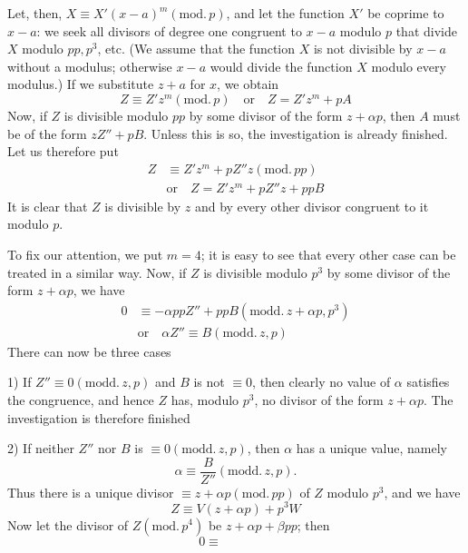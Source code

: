 Let, then, $X\equiv X'(x-a)^m(\mathrm{mod.}\,p)$, and let the function $X'$ be coprime to $x-a$: we seek all divisors of degree one congruent to $x-a$ modulo $p$ that divide $X$ modulo $pp,p^3$, etc. (We assume that the function $X$ is not divisible by $x-a$ without a modulus; otherwise $x-a$ would divide the function $X$ modulo every modulus.) If we substitute $z+a$ for $x$, we obtain
\[
Z\equiv Z'z^m(\mathrm{mod.}\,p)\quad\text{or}\quad Z=Z'z^m+pA
\]
Now, if $Z$ is divisible modulo $pp$ by some divisor of the form $z+\alpha p$, then $A$ must be of the form $zZ''+pB$. Unless this is so, the investigation is already finished. Let us therefore put
\[
\begin{aligned}
Z&\equiv Z'z^m+pZ''z(\mathrm{mod.}\,pp)\\
&\text{or}\quad Z=Z'z^m+pZ''z+ppB
\end{aligned}
\]
It is clear that $Z$ is divisible by $z$ and by every other divisor congruent to it modulo $p$.

To fix our attention, we put $m=4$; it is easy to see that every other case can be treated in a similar way. Now, if $Z$ is divisible modulo $p^3$ by some divisor of the form $z+\alpha p$, we have
\[
\begin{aligned}
0&\equiv-\alpha ppZ''+ppB(\mathrm{modd.}\,z+\alpha p,p^3)\\
&\text{or}\quad\alpha Z''\equiv B(\mathrm{modd.}\,z,p)
\end{aligned}
\]
There can now be three cases

1) If $Z''\equiv0(\mathrm{modd.}\,z,p)$ and $B$ is not $\equiv0$, then clearly no value of $\alpha$ satisfies the congruence, and hence $Z$ has, modulo $p^3$, no divisor of the form $z+\alpha p$. The investigation is therefore finished

2) If neither $Z''$ nor $B$ is $\equiv0(\mathrm{modd.}\,z,p)$, then $\alpha$ has a unique value, namely
\[
\alpha\equiv\frac B{Z''}(\mathrm{modd.}\,z,p).
\]
Thus there is a unique divisor $\equiv z+\alpha p(\mathrm{mod.}\,pp)$ of $Z$ modulo $p^3$, and we have
\[
Z\equiv V(z+\alpha p)+p^3W
\]
Now let the divisor of $Z(\mathrm{mod.}\,p^4)$ be $z+\alpha p+\beta pp$; then
\[
0\equiv\qquad\qquad
\]
